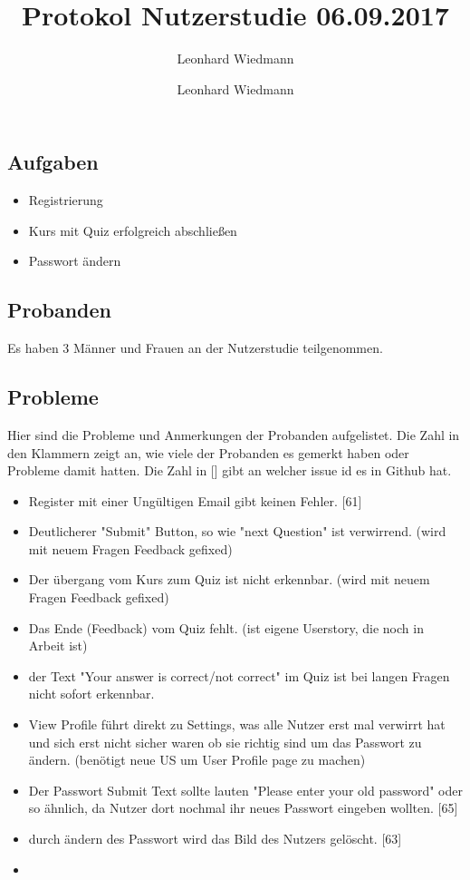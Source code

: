 \documentclass[colorback, accentcolor=tud1c, paper=a4]{tudexercise}
\title{Protokol Nutzerstudie 06.09.2017}
\subtitle{Leonhard Wiedmann}
\author{Leonhard Wiedmann}
\begin{document}
\maketitle
\subsection*{Aufgaben}
	\begin{itemize}
	\item Registrierung
  \item Kurs mit Quiz erfolgreich abschließen
  \item Passwort ändern
	\end{itemize}

\subsection*{Probanden}
Es haben 3 Männer und Frauen an der Nutzerstudie teilgenommen.

\subsection*{Probleme}
  Hier sind die Probleme und Anmerkungen der Probanden aufgelistet. Die Zahl in den Klammern zeigt an, wie viele der Probanden es gemerkt haben oder Probleme damit hatten. Die Zahl in [] gibt an welcher issue id es in Github hat.
  \begin{itemize}
		\item Register mit einer Ungültigen Email gibt keinen Fehler. [61]
    \item Deutlicherer "Submit" Button, so wie "next Question" ist verwirrend. (wird mit neuem Fragen Feedback gefixed)
		\item Der übergang vom Kurs zum Quiz ist nicht erkennbar. (wird mit neuem Fragen Feedback gefixed)
		\item Das Ende (Feedback) vom Quiz fehlt. (ist eigene Userstory, die noch in Arbeit ist)
		\item der Text "Your answer is correct/not correct" im Quiz ist bei langen Fragen nicht sofort erkennbar.
		\item View Profile führt direkt zu Settings, was alle Nutzer erst mal verwirrt hat und sich erst nicht sicher waren ob sie richtig sind um das Passwort zu ändern. (benötigt neue US um User Profile page zu machen)
		\item Der Passwort Submit Text sollte lauten "Please enter your old password" oder so ähnlich, da Nutzer dort nochmal ihr neues Passwort eingeben wollten. [65]
		\item durch ändern des Passwort wird das Bild des Nutzers gelöscht. [63]
		\item
   \end{itemize}
\end{document}
